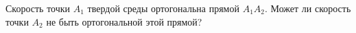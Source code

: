 Скорость точки $A_{1}$ твердой среды ортогональна прямой $A_{1}A_{2}$. Может ли
скорость точки $A_{2}$ не быть ортогональной этой прямой?
